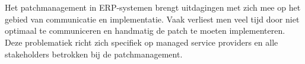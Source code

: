 
\chapter{}%
\label{ch:inleiding}




\section{}%
\label{sec:probleemstelling}

Het patchmanagement in ERP-systemen brengt uitdagingen met zich mee op het gebied van communicatie en implementatie. Vaak verliest men veel tijd door niet optimaal te communiceren en handmatig de patch te moeten implementeren. Deze problematiek richt zich specifiek op managed service providers en alle stakeholders betrokken bij de patchmanagement.

\section{}%
\label{sec:onderzoeksvraag}

